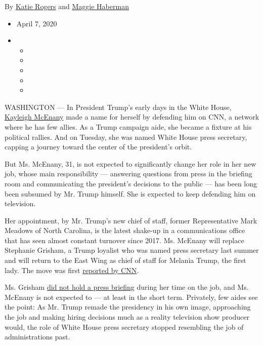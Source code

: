 By \href{https://www.nytimes.com/by/katie-rogers}{Katie Rogers} and
\href{https://www.nytimes.com/by/maggie-haberman}{Maggie Haberman}

\begin{itemize}
\item
  April 7, 2020
\item
  \begin{itemize}
  \item
  \item
  \item
  \item
  \item
  \end{itemize}
\end{itemize}

WASHINGTON --- In President Trump's early days in the White House,
\href{https://www.nytimes.com/2020/05/22/us/politics/coronavirus-trump-press-secretary-check.html}{Kayleigh
McEnany} made a name for herself by defending him on CNN, a network
where he has few allies. As a Trump campaign aide, she became a fixture
at his political rallies. And on Tuesday, she was named White House
press secretary, capping a journey toward the center of the president's
orbit.

But Ms. McEnany, 31, is not expected to significantly change her role in
her new job, whose main responsibility --- answering questions from
press in the briefing room and communicating the president's decisions
to the public --- has been long been subsumed by Mr. Trump himself. She
is expected to keep defending him on television.

Her appointment, by Mr. Trump's new chief of staff, former
Representative Mark Meadows of North Carolina, is the latest shake-up in
a communications office that has seen almost constant turnover since
2017. Ms. McEnany will replace Stephanie Grisham, a Trump loyalist who
was named press secretary last summer and will return to the East Wing
as chief of staff for Melania Trump, the first lady. The move was first
\href{https://www.cnn.com/2020/04/07/politics/stephanie-grisham-press-secretary-briefing-melania-trump/index.html}{reported
by CNN}.

Ms. Grisham
\href{https://www.nytimes.com/2020/01/10/business/media/stephanie-grisham-trump-press-secretary.html}{did
not hold a press briefing} during her time on the job, and Ms. McEnany
is not expected to --- at least in the short term. Privately, few aides
see the point: As Mr. Trump remade the presidency in his own image,
approaching the job and making hiring decisions much as a reality
television show producer would, the role of White House press secretary
stopped resembling the job of administrations past.

